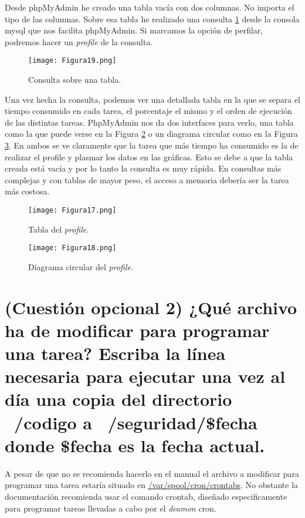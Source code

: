 Desde phpMyAdmin he creado una tabla vacía con dos columnas. No importa el tipo de las columnas. Sobre esa tabla he realizado una consulta \ref{fig:figura19}
desde la consola mysql que nos facilita phpMyAdmin. Si marcamos la opción de perfilar, podremos hacer un \textit{profile} de la consulta.

\begin{figure}[H] 
\centering
\texttt{[image: Figura19.png]}  
\caption{Consulta sobre una tabla.}\label{fig:figura19}
\end{figure}

Una vez hecha la consulta, podemos ver una detallada tabla en la que se separa el tiempo consumido en cada tarea, el porcentaje el mismo y el orden de ejecución de 
las distintas tareas. PhpMyAdmin nos da dos interfaces para verlo, una tabla como la que puede verse en la Figura \ref{fig:figura17} o un diagrama  circular como en la 
Figura \ref{fig:figura18}. En ambos se ve claramente que la tarea que más tiempo ha consumido es la de realizar el profile y plasmar los datos en las gráficas. Esto se 
debe a que la tabla creada está vacía y por lo tanto la consulta es muy rápida. En consultas más  complejas y con tablas de mayor peso, el acceso a memoria debería
ser la tarea más costosa.

\begin{figure}[H] 
\centering
\texttt{[image: Figura17.png]}  
\caption{Tabla del \textit{profile}.}\label{fig:figura17}
\end{figure}

\begin{figure}[H] 
\centering
\texttt{[image: Figura18.png]}  
\caption{Diagrama circular del \textit{profile}.}\label{fig:figura18}
\end{figure}


\section{(Cuestión opcional 2) ¿Qué archivo ha de modificar para programar una tarea? Escriba la línea necesaria para ejecutar una vez al día una copia del directorio ~/codigo a ~/seguridad/\$fecha donde \$fecha es la fecha actual.}

A pesar de que no se recomienda hacerlo en el manual\cite{crontab} el archivo a modificar para programar una tarea estaría situado en \url{/var/spool/cron/crontabs}.
No obstante la documentación recomienda usar el comando crontab, diseñado especificamente para programar tareas llevadas a cabo por el \textit{deamon} cron.

